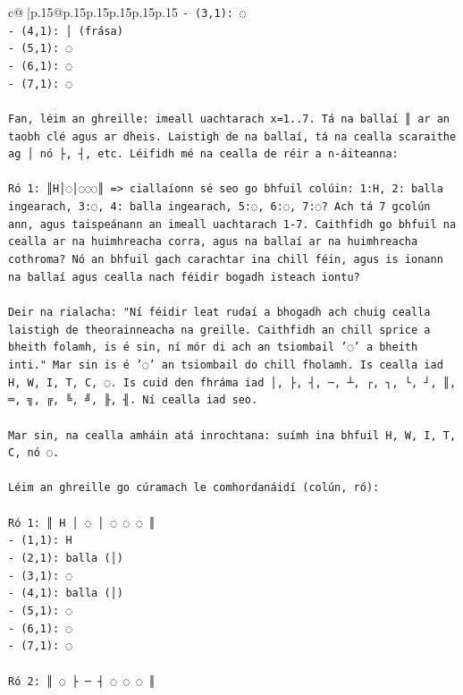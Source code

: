 \documentclass{article}
\begin{document}
{\begin{supertabular}{c@{$\;$}|p{.15\linewidth}@{}p{.15\linewidth}p{.15\linewidth}p{.15\linewidth}p{.15\linewidth}p{.15\linewidth}}
{{{\texttt{{-} (3,1): ◌} \\
\texttt{{-} (4,1): │ (frása)} \\
\texttt{{-} (5,1): ◌} \\
\texttt{{-} (6,1): ◌} \\
\texttt{{-} (7,1): ◌} \\
\\ 
\texttt{Fan, léim an ghreille: imeall uachtarach x=1..7. Tá na ballaí ║ ar an taobh clé agus ar dheis. Laistigh de na ballaí, tá na cealla scaraithe ag │ nó ├, ┤, etc. Léifidh mé na cealla de réir a n{-}áiteanna:} \\
\\ 
\texttt{Ró 1: ║H│◌│◌◌◌║ => ciallaíonn sé seo go bhfuil colúin: 1:H, 2: balla ingearach, 3:◌, 4: balla ingearach, 5:◌, 6:◌, 7:◌? Ach tá 7 gcolún ann, agus taispeánann an imeall uachtarach 1{-}7. Caithfidh go bhfuil na cealla ar na huimhreacha corra, agus na ballaí ar na huimhreacha cothroma? Nó an bhfuil gach carachtar ina chill féin, agus is ionann na ballaí agus cealla nach féidir bogadh isteach iontu?} \\
\\ 
\texttt{Deir na rialacha: "Ní féidir leat rudaí a bhogadh ach chuig cealla laistigh de theorainneacha na greille. Caithfidh an chill sprice a bheith folamh, is é sin, ní mór di ach an tsiombail '◌' a bheith inti." Mar sin is é '◌' an tsiombail do chill fholamh. Is cealla iad H, W, I, T, C, ◌. Is cuid den fhráma iad │, ├, ┤, ─, ┴, ┌, ┐, └, ┘, ║, ═, ╗, ╔, ╚, ╝, ╟, ╢. Ní cealla iad seo.} \\
\\ 
\texttt{Mar sin, na cealla amháin atá inrochtana: suímh ina bhfuil H, W, I, T, C, nó ◌.} \\
\\ 
\texttt{Léim an ghreille go cúramach le comhordanáidí (colún, ró):} \\
\\ 
\texttt{Ró 1: ║ H │ ◌ │ ◌ ◌ ◌ ║} \\
\texttt{{-} (1,1): H} \\
\texttt{{-} (2,1): balla (│)} \\
\texttt{{-} (3,1): ◌} \\
\texttt{{-} (4,1): balla (│)} \\
\texttt{{-} (5,1): ◌} \\
\texttt{{-} (6,1): ◌} \\
\texttt{{-} (7,1): ◌} \\
\\ 
\texttt{Ró 2: ║ ◌ ├ ─ ┤ ◌ ◌ ◌ ║} \\
}}}
\end{supertabular}}
\end{document}
